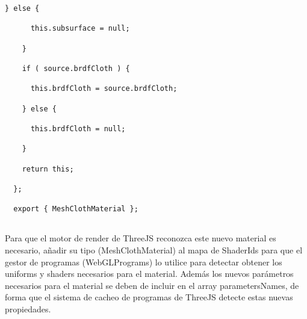 \begin{lstlisting}[caption=Clase MeshClothMaterial]
    } else {
  
      this.subsurface = null;
  
    }
  
    if ( source.brdfCloth ) {
  
      this.brdfCloth = source.brdfCloth;
  
    } else {
  
      this.brdfCloth = null;
  
    }
  
    return this;
  
  };
  
  export { MeshClothMaterial };
  
\end{lstlisting}

Para que el motor de render de ThreeJS reconozca este nuevo material es necesario, a\~nadir
su tipo (MeshClothMaterial) al mapa de ShaderIds para que el gestor de programas (WebGLPrograms)
lo utilice para detectar obtener los uniforms y shaders necesarios para el material. Adem\'as
los nuevos par\'ametros necesarios para el material se deben de incluir en el array
parametersNames, de forma que el sistema de cacheo de programas de ThreeJS detecte estas
nuevas propiedades.\newline

